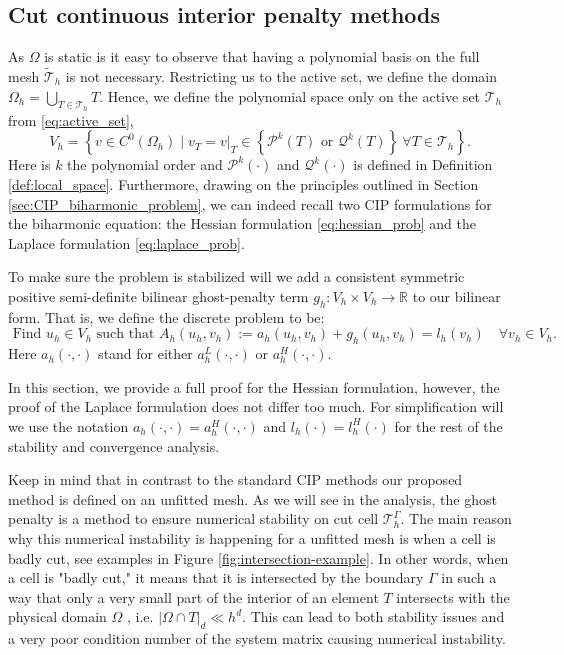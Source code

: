 \documentclass[11pt]{article}
\theoremstyle{remark}
\newcommand{\abs}[1]{\left\lvert #1 \right\rvert}
\numberwithin{equation}{section}
\begin{document}
\subsection{Cut continuous interior penalty methods }%
\label{sub:cut_cip_method}

As $\Omega $ is static is it easy to observe that having a polynomial basis on the full mesh $\widetilde{\mathcal{T}}_{h}$ is not necessary. Restricting us to the active set, we define the domain $\Omega _{h} = \bigcup _{T \in \mathcal{T} _{h}} T$.
Hence, we define the polynomial space only on the active set $\mathcal{T}_{h} $ from \eqref{eq:active_set},
\begin{equation}
    \label{eq:vh_energy}
V_{h} = \left\{ v \in C^{0}( \Omega _{h}  )  \mid  v_{T} = v | _{T} \in \left\{ \mathcal{P} ^{k} ( T ) \text{ or } \mathcal{Q} ^{k}( T ) \right\}  \  \forall T \in
\mathcal{T}_{h}    \right\}.
\end{equation}
Here is $k$ the polynomial order and $\mathcal{P}^{k}( \cdot  )  $ and $\mathcal{Q} ^{k}( \cdot ) $ is defined in Definition \ref{def:local_space}.
Furthermore, drawing on the principles outlined in Section \ref{sec:CIP_biharmonic_problem}, we can indeed recall two CIP formulations for the biharmonic equation: the Hessian formulation \eqref{eq:hessian_prob} and the Laplace formulation \eqref{eq:laplace_prob}.

To make sure the problem is stabilized will we add a consistent symmetric positive semi-definite bilinear ghost-penalty term  $g_{h}: V_{h} \times  V_{h} \to \mathbb{R} $ to our bilinear form. That is, we define the discrete problem to be:
\begin{equation}
\label{eq:discrete_CutCIP_prob}
\text{ Find } u_{h} \in V_{h}  \text{ such that }    A_{h}( u_{h} ,v_{h} ) := a_{h}( u_{h}, v_{h})  + g_{h}( u_{h},v_{h}) = l_{h} ( v_{h}) \quad  \forall v_{h} \in  V_{h}.
\end{equation}
Here $a_{h}( \cdot,\cdot  ) $ stand for either $a_{h}^{L}( \cdot ,\cdot ) $ or $a_{h}^{H}( \cdot ,\cdot ) $.

In this section, we provide a full proof for the Hessian formulation, however, the proof of the Laplace formulation does not differ too much. For simplification will we use the notation $a_{h}(\cdot ,\cdot  ) = a_{h}^{H}(\cdot  ,\cdot )$ and
$l_{h}(\cdot ) =l_{h}^{H}(\cdot )$ for the rest of the stability and convergence analysis.

Keep in mind that in contrast to the standard CIP methods our proposed method is defined on an unfitted mesh. As we will see in the analysis, the ghost penalty is a method to ensure numerical stability on cut cell $\mathcal{T} ^{\Gamma }_{h}$. The main reason why
this numerical instability is happening for a unfitted mesh is when a cell is badly cut, see examples in Figure \ref{fig:intersection-example}.
In other words, when a cell is "badly cut," it means that it is intersected by the boundary $\Gamma$ in such a way that only a very small part of the interior of an element $T$  intersects with the physical domain $\Omega $ , i.e. $\abs{ \Omega \cap
T }_{d} \ll h^{d}$. This can lead to both stability issues and a very poor condition number of the system matrix causing numerical instability.
\end{document}
